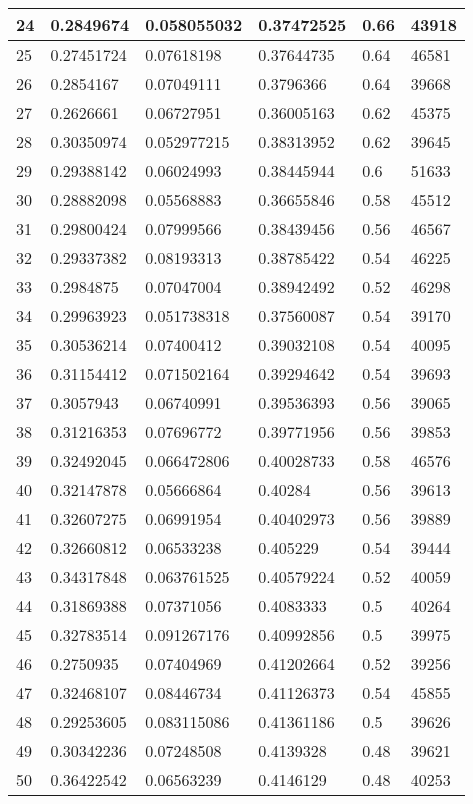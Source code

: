 \begin{longtable}{|l|l|l|l|l|l|}
24 & 0.2849674 & 0.058055032 & 0.37472525 & 0.66 & 43918 \\ \hline 
25 & 0.27451724 & 0.07618198 & 0.37644735 & 0.64 & 46581 \\ \hline 
26 & 0.2854167 & 0.07049111 & 0.3796366 & 0.64 & 39668 \\ \hline 
27 & 0.2626661 & 0.06727951 & 0.36005163 & 0.62 & 45375 \\ \hline 
28 & 0.30350974 & 0.052977215 & 0.38313952 & 0.62 & 39645 \\ \hline 
29 & 0.29388142 & 0.06024993 & 0.38445944 & 0.6 & 51633 \\ \hline 
30 & 0.28882098 & 0.05568883 & 0.36655846 & 0.58 & 45512 \\ \hline 
31 & 0.29800424 & 0.07999566 & 0.38439456 & 0.56 & 46567 \\ \hline 
32 & 0.29337382 & 0.08193313 & 0.38785422 & 0.54 & 46225 \\ \hline 
33 & 0.2984875 & 0.07047004 & 0.38942492 & 0.52 & 46298 \\ \hline 
34 & 0.29963923 & 0.051738318 & 0.37560087 & 0.54 & 39170 \\ \hline 
35 & 0.30536214 & 0.07400412 & 0.39032108 & 0.54 & 40095 \\ \hline 
36 & 0.31154412 & 0.071502164 & 0.39294642 & 0.54 & 39693 \\ \hline 
37 & 0.3057943 & 0.06740991 & 0.39536393 & 0.56 & 39065 \\ \hline 
38 & 0.31216353 & 0.07696772 & 0.39771956 & 0.56 & 39853 \\ \hline 
39 & 0.32492045 & 0.066472806 & 0.40028733 & 0.58 & 46576 \\ \hline 
40 & 0.32147878 & 0.05666864 & 0.40284 & 0.56 & 39613 \\ \hline 
41 & 0.32607275 & 0.06991954 & 0.40402973 & 0.56 & 39889 \\ \hline 
42 & 0.32660812 & 0.06533238 & 0.405229 & 0.54 & 39444 \\ \hline 
43 & 0.34317848 & 0.063761525 & 0.40579224 & 0.52 & 40059 \\ \hline 
44 & 0.31869388 & 0.07371056 & 0.4083333 & 0.5 & 40264 \\ \hline 
45 & 0.32783514 & 0.091267176 & 0.40992856 & 0.5 & 39975 \\ \hline 
46 & 0.2750935 & 0.07404969 & 0.41202664 & 0.52 & 39256 \\ \hline 
47 & 0.32468107 & 0.08446734 & 0.41126373 & 0.54 & 45855 \\ \hline 
48 & 0.29253605 & 0.083115086 & 0.41361186 & 0.5 & 39626 \\ \hline 
49 & 0.30342236 & 0.07248508 & 0.4139328 & 0.48 & 39621 \\ \hline 
50 & 0.36422542 & 0.06563239 & 0.4146129 & 0.48 & 40253 \\ \hline 
\end{longtable}